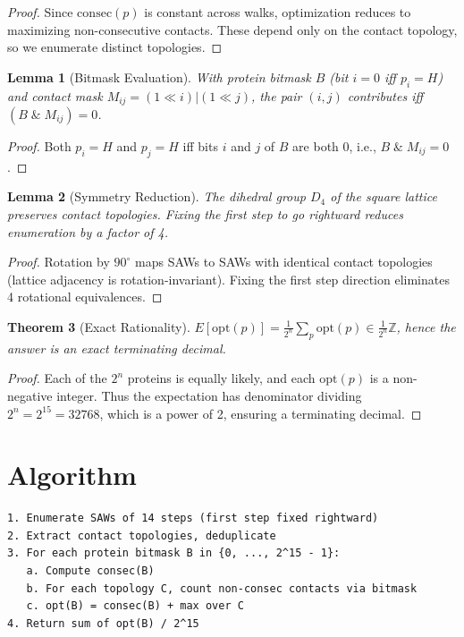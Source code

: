 \documentclass[12pt]{article}
\newtheorem{theorem}{Theorem}
\newtheorem{lemma}[theorem]{Lemma}
\begin{document}
\begin{proof}
Since $\mathrm{consec}(p)$ is constant across walks, optimization reduces to maximizing non-consecutive contacts. These depend only on the contact topology, so we enumerate distinct topologies.
\end{proof}

\begin{lemma}[Bitmask Evaluation]
With protein bitmask $B$ (bit $i = 0$ iff $p_i = H$) and contact mask $M_{ij} = (1 \ll i) | (1 \ll j)$, the pair $(i,j)$ contributes iff $(B \;\&\; M_{ij}) = 0$.
\end{lemma}

\begin{proof}
Both $p_i = H$ and $p_j = H$ iff bits $i$ and $j$ of $B$ are both 0, i.e., $B \;\&\; M_{ij} = 0$.
\end{proof}

\begin{lemma}[Symmetry Reduction]
The dihedral group $D_4$ of the square lattice preserves contact topologies. Fixing the first step to go rightward reduces enumeration by a factor of 4.
\end{lemma}

\begin{proof}
Rotation by $90^\circ$ maps SAWs to SAWs with identical contact topologies (lattice adjacency is rotation-invariant). Fixing the first step direction eliminates 4 rotational equivalences.
\end{proof}

\begin{theorem}[Exact Rationality]
$E[\mathrm{opt}(p)] = \frac{1}{2^n} \sum_p \mathrm{opt}(p) \in \frac{1}{2^n}\mathbb{Z}$, hence the answer is an exact terminating decimal.
\end{theorem}

\begin{proof}
Each of the $2^n$ proteins is equally likely, and each $\mathrm{opt}(p)$ is a non-negative integer. Thus the expectation has denominator dividing $2^n = 2^{15} = 32768$, which is a power of 2, ensuring a terminating decimal.
\end{proof}

\section{Algorithm}

\begin{verbatim}
1. Enumerate SAWs of 14 steps (first step fixed rightward)
2. Extract contact topologies, deduplicate
3. For each protein bitmask B in {0, ..., 2^15 - 1}:
   a. Compute consec(B)
   b. For each topology C, count non-consec contacts via bitmask
   c. opt(B) = consec(B) + max over C
4. Return sum of opt(B) / 2^15
\end{verbatim}
\end{document}

